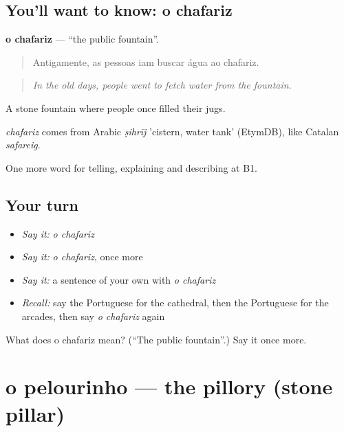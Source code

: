 \subsection*{You'll want to know: o chafariz}
\textbf{o chafariz} — \textquotedblleft{}the public fountain\textquotedblright{}.

\begin{quote}
Antigamente, as pessoas iam buscar água ao chafariz.
\end{quote}

\begin{quote}
\emph{In the old days, people went to fetch water from the fountain.}
\end{quote}

A stone fountain where people once filled their jugs.

\begin{cousinweb}
\emph{chafariz} comes from Arabic \emph{ṣihrīj} 'cistern, water tank' (EtymDB), like Catalan \emph{safareig}.
\end{cousinweb}

\begin{grammarlens}[title={What you've built}]
One more word for telling, explaining and describing at B1.
\end{grammarlens}

\subsection*{Your turn}
\begin{itemize}
\raggedright
  \item \emph{Say it:} \emph{o chafariz}
  \item \emph{Say it:} \emph{o chafariz}, once more
  \item \emph{Say it:} a sentence of your own with \emph{o chafariz}
  \item \emph{Recall:} say the Portuguese for the cathedral, then the Portuguese for the arcades, then say \emph{o chafariz} again
\end{itemize}

\begin{tcolorbox}[breakable,colback=teal!4,colframe=teal!35!black,title={Before you move on}]
What does o chafariz mean? (\textquotedblleft{}The public fountain\textquotedblright{}.) Say it once more.
\end{tcolorbox}
\section[o pelourinho]{o pelourinho — the pillory (stone pillar)}

